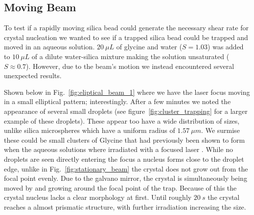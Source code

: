 \subsection{Moving Beam}
\label{sec:moving}
To test if a rapidly moving silica bead could generate the necessary shear rate 
for crystal nucleation we wanted to see if a trapped silica bead could be trapped
and moved in an aqueous solution. $20\ \mu L$ of glycine and water ($S=1.03$) was 
added to $10\ \mu L$ of a dilute water-silica mixture making the solution 
unsaturated ($S\approx0.7$). However, due to the beam's motion we instead 
encountered several unexpected results. 

Shown below in Fig.~\ref{fig:eliptical_beam_1} where we have the laser focus 
moving in a small elliptical pattern; interestingly. After a few minutes we 
noted the appearance of several small droplets (see figure~\ref{fig:cluster_trapping}
for a larger example of these droplets). These appear too have a wide distribution
of sizes, unlike silica microspheres which have a uniform radius of $1.57\ 
\mu m$. We surmise these could be small clusters of Glycine that had previously 
been shown to form when the aqueous solutions where irradiated with a 
focused laser \cite{Tsuboi2009, Gowayed2021}. While no droplets are seen 
directly entering the focus a nucleus forms close to the droplet edge, 
unlike in Fig.~\ref{fig:stationary_beam} the crystal does not grow out from 
the focal point evenly. Due to the galvano mirror, the crystal is simultaneously 
being moved by and growing around the focal point of the trap. Because of 
this the crystal nucleus lacks a clear morphology at first. Until roughly 
$20\ s$ the crystal reaches a almost prismatic structure, with further 
irradiation increasing the size.
 
